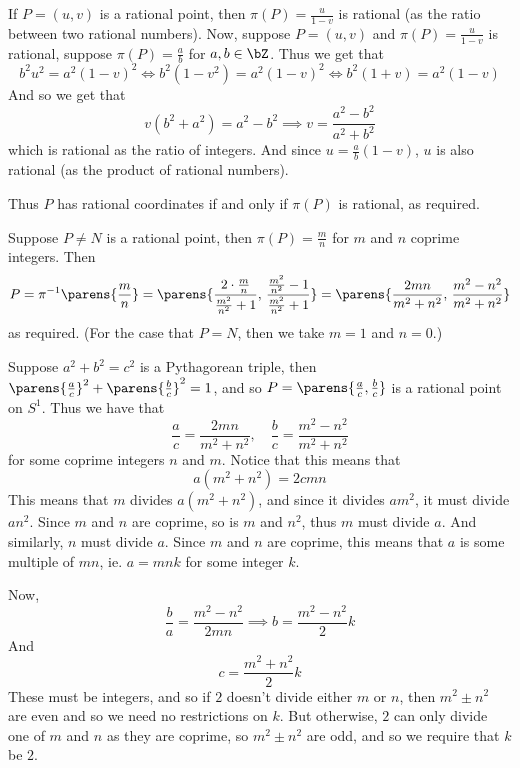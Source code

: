 \documentclass[10pt]{article}
\begin{document}
        \item If $P=(u,v)$ is a rational point, then $\pi(P)=\frac u{1-v}$ is rational (as the ratio between two rational numbers).
        Now, suppose $P=(u,v)$ and $\pi(P)=\frac u{1-v}$ is rational, suppose $\pi(P)=\frac ab$ for $a,b\in\bZ$.
        Thus we get that
        \[ b^2u^2 = a^2(1-v)^2 \iff b^2(1-v^2) = a^2(1-v)^2 \iff b^2(1+v) = a^2(1-v) \]
        And so we get that
        \[ v(b^2+a^2) = a^2-b^2 \implies v = \frac{a^2-b^2}{a^2+b^2} \]
        which is rational as the ratio of integers.
        And since $u=\frac ab(1-v)$, $u$ is also rational (as the product of rational numbers).

        Thus $P$ has rational coordinates if and only if $\pi(P)$ is rational, as required.

        \item Suppose $P\neq N$ is a rational point, then $\pi(P)=\frac mn$ for $m$ and $n$ coprime integers.
        Then
        \[ P = \pi^{-1}\parens{\frac mn} = \parens{\frac{2\cdot\frac mn}{\frac{m^2}{n^2}+1},\,\frac{\frac{m^2}{n^2}-1}{\frac{m^2}{n^2}+1}} = \parens{\frac{2mn}{m^2+n^2},\,\frac{m^2-n^2}{m^2+n^2}} \]
        as required.
        (For the case that $P=N$, then we take $m=1$ and $n=0$.)

        \item Suppose $a^2+b^2=c^2$ is a Pythagorean triple, then $\parens{\frac ac}^2+\parens{\frac bc}^2=1$, and so $P=\parens{\frac ac,\frac bc}$ is a rational point on $S^1$.
        Thus we have that
        \[ \frac ac = \frac{2mn}{m^2+n^2},\quad \frac bc = \frac{m^2-n^2}{m^2+n^2} \]
        for some coprime integers $n$ and $m$.
        Notice that this means that
        \[ a(m^2+n^2) = 2cmn \]
        This means that $m$ divides $a(m^2+n^2)$, and since it divides $am^2$, it must divide $an^2$.
        Since $m$ and $n$ are coprime, so is $m$ and $n^2$, thus $m$ must divide $a$.
        And similarly, $n$ must divide $a$.
        Since $m$ and $n$ are coprime, this means that $a$ is some multiple of $mn$, ie. $a=mnk$ for some integer $k$.

        Now,
        \[ \frac ba = \frac{m^2-n^2}{2mn} \implies b = \frac{m^2-n^2}2k \]
        And
        \[ c = \frac{m^2+n^2}2k \]
        These must be integers, and so if $2$ doesn't divide either $m$ or $n$, then $m^2\pm n^2$ are even and so we need no restrictions on $k$.
        But otherwise, $2$ can only divide one of $m$ and $n$ as they are coprime, so $m^2\pm n^2$ are odd, and so we require that $k$ be $2$.
\end{document}
